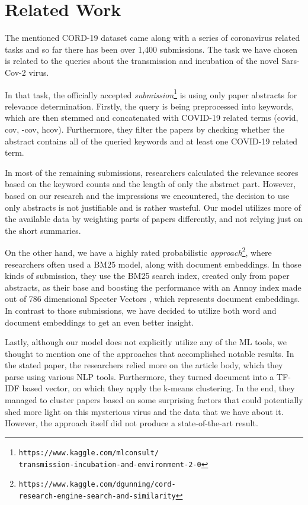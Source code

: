 \documentclass[10pt, a4paper]{article}
\begin{document}
	\section{Related Work}

	The mentioned CORD-19 dataset came along with a series of coronavirus related tasks and so far there has been over 1,400 submissions. The task we have chosen is related to the queries about the transmission and incubation of the novel Sars-Cov-2 virus.

	In that task, the officially accepted \emph{submission}\footnote{\texttt{https://www.kaggle.com/mlconsult/\\transmission-incubation-and-environment-2-0}} is using only paper abstracts for relevance determination. Firstly, the query is being preprocessed into keywords, which are then stemmed and concatenated with COVID-19 related terms (covid, cov, -cov, hcov). Furthermore, they filter the papers by checking whether the abstract contains all of the queried keywords and at least one COVID-19 related term.

	In most of the remaining submissions, researchers calculated the relevance scores based on the keyword counts and the length of only the abstract part. However, based on our research and the impressions we encountered, the decision to use only abstracts is not justifiable and is rather wasteful. Our model utilizes more of the available data by weighting parts of papers differently, and not relying just on the short summaries.

	On the other hand, we have a highly rated probabilistic \emph{approach}\footnote{\texttt{https://www.kaggle.com/dgunning/cord-\\research-engine-search-and-similarity}}, where researchers often used a BM25 model, along with document embeddings. In those kinds of submission, they use the BM25 search index, created only from paper abstracts, as their base and boosting the performance with an Annoy index made out of 786 dimensional Specter Vectors \citep{cohan-etal-2020-specter}, which represents document embeddings. In contrast to those submissions, we have decided to utilize both word and document embeddings to get an even better insight.

	Lastly, although our model does not explicitly utilize any of the ML tools, we thought to mention one of the approaches that accomplished notable results. In the stated paper, the researchers relied more on the article body, which they parse using various NLP tools. Furthermore, they turned document into a TF-IDF based vector, on which they apply the k-means clustering. In the end, they managed to cluster papers based on some surprising factors that could potentially shed more light on this mysterious virus and the data that we have about it. However, the approach itself did not produce a state-of-the-art result.
\end{document}
